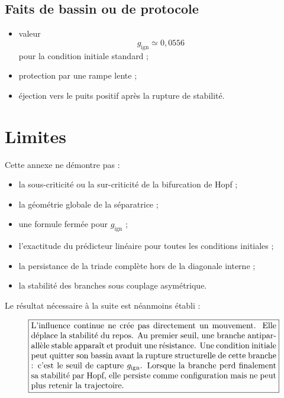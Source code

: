 \subsection{Faits de bassin ou de protocole}

\begin{itemize}
\item
  valeur
  \[
  g_{\mathrm{ign}}\simeq0{,}0556
  \]
  pour la condition initiale standard ;
\item
  protection par une rampe lente ;
\item
  éjection vers le puits positif après la rupture de stabilité.
\end{itemize}

\section{Limites}
\label{annexe-resistance-limites}

Cette annexe ne démontre pas :

\begin{itemize}
\item
  la sous-criticité ou la sur-criticité de la bifurcation de Hopf ;
\item
  la géométrie globale de la séparatrice ;
\item
  une formule fermée pour
  \(g_{\mathrm{ign}}\) ;
\item
  l'exactitude du prédicteur linéaire pour toutes les conditions
  initiales ;
\item
  la persistance de la triade complète hors de la diagonale interne ;
\item
  la stabilité des branches sous couplage asymétrique.
\end{itemize}

Le résultat nécessaire à la suite est néanmoins établi :

\[
\boxed{
\begin{minipage}{0.86\linewidth}
L'influence continue ne crée pas directement un mouvement. Elle
déplace la stabilité du repos. Au premier seuil, une branche
antiparallèle stable apparaît et produit une résistance. Une condition
initiale peut quitter son bassin avant la rupture structurelle de cette
branche : c'est le seuil de capture \(g_{\mathrm{ign}}\). Lorsque la
branche perd finalement sa stabilité par Hopf, elle persiste comme
configuration mais ne peut plus retenir la trajectoire.
\end{minipage}
}
\]
